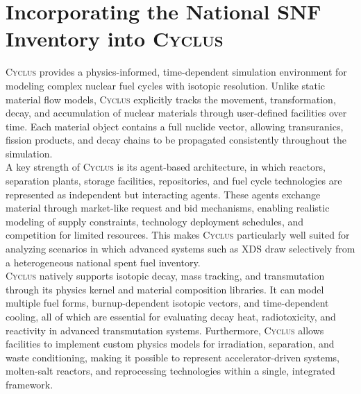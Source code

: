 
\section{Incorporating the National \gls{SNF} Inventory into \textsc{Cyclus}}

    \textsc{Cyclus} provides a physics-informed, time-dependent simulation environment for modeling complex nuclear fuel cycles with
    isotopic resolution. Unlike static material flow models, \textsc{Cyclus} explicitly tracks the movement, transformation, decay,
    and accumulation of nuclear materials through user-defined facilities over time. Each material object contains a full nuclide vector,
    allowing transuranics, fission products, and decay chains to be propagated consistently throughout the simulation\cite{gidden_agent-based_2015}.\\

    A key strength of \textsc{Cyclus} is its agent-based architecture, in which reactors, separation plants, storage facilities, repositories,
    and fuel cycle technologies are represented as independent but interacting agents. These agents exchange material through market-like
    request and bid mechanisms, enabling realistic modeling of supply constraints, technology deployment schedules, and competition for limited
    resources. This makes \textsc{Cyclus} particularly well suited for analyzing scenarios in which advanced systems such as \gls{XDS} draw
    selectively from a heterogeneous national spent fuel inventory\cite{scopatz_cyclus_2015}.\\

    \textsc{Cyclus} natively supports isotopic decay, mass tracking, and transmutation through its physics kernel and material composition
    libraries. It can model multiple fuel forms, burnup-dependent isotopic vectors, and time-dependent cooling, all of which are essential
    for evaluating decay heat, radiotoxicity, and reactivity in advanced transmutation systems. Furthermore, \textsc{Cyclus} allows facilities
    to implement custom physics models for irradiation, separation, and waste conditioning, making it possible to represent accelerator-driven
    systems, molten-salt reactors, and reprocessing technologies within a single, integrated framework.\\


